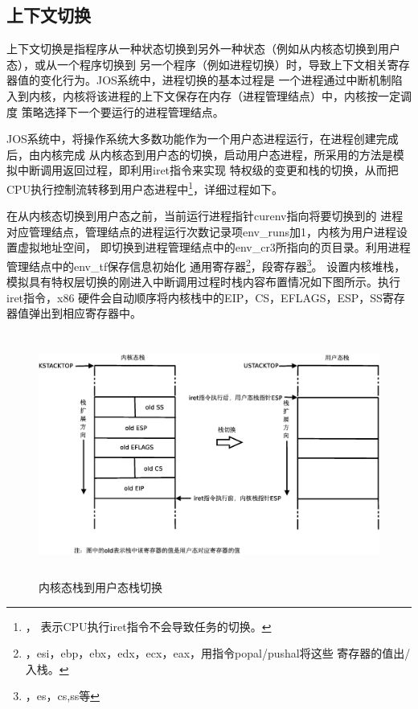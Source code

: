 \documentclass[12pt,openany,a4paper]{report}
\begin{document}
	\subsection{上下文切换}
	    上下文切换是指程序从一种状态切换到另外一种状态（例如从内核态切换到用户态），或从一个程序切换到
	另一个程序（例如进程切换）时，导致上下文相关寄存器值的变化行为。JOS系统中，进程切换的基本过程是
	一个进程通过中断机制陷入到内核，内核将该进程的上下文保存在内存（进程管理结点）中，内核按一定调度
	策略选择下一个要运行的进程管理结点。\par   
	    JOS系统中，将操作系统大多数功能作为一个用户态进程运行，在进程创建完成后，由内核完成
	从内核态到用户态的切换，启动用户态进程，所采用的方法是模拟中断调用返回过程，即利用iret指令来实现
	特权级的变更和栈的切换，从而把CPU执行控制流转移到用户态进程中\footnote{，
	表示CPU执行iret指令不会导致任务的切换。}，详细过程如下。\par
	    在从内核态切换到用户态之前，当前运行进程指针curenv指向将要切换到的
	进程对应管理结点，管理结点的进程运行次数记录项env\_runs加1，内核为用户进程设置虚拟地址空间，
	即切换到进程管理结点中的env\_cr3所指向的页目录。利用进程管理结点中的env\_tf保存信息初始化
	通用寄存器\footnote{，esi，ebp，ebx，edx，ecx，eax，用指令popal/pushal将这些
	寄存器的值出/入栈。}，段寄存器\footnote{，es，cs,ss等}。
	设置内核堆栈，模拟具有特权层切换的刚进入中断调用过程时栈内容布置情况如下图所示。执行iret指令，x86
	硬件会自动顺序将内核栈中的EIP，CS，EFLAGS，ESP，SS寄存器值弹出到相应寄存器中。\par
	
	\begin{figure}[htb]
		\centering
		\includegraphics[height=8cm]{iret.eps}
		\caption[内核态栈到用户态栈切换]{内核态栈到用户态栈切换}
	\end{figure}
	
\end{document}
